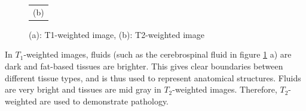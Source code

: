 \begin{figure}[h!]
\begin{minipage}{.4\textwidth}
\begin{tabular}{c}
(b)
\end{tabular}
\end{minipage}
\caption{(a): T1-weighted image, (b): T2-weighted image}
\label{tweight}
\end{figure}
In \(T_1\)-weighted images, fluids (such as the cerebrospinal fluid in figure \ref{tweight} a) are dark and fat-based tissues are brighter. This gives clear boundaries between different tissue types, and is thus used to represent anatomical structures. Fluids are very bright and tissues are mid gray in \(T_2\)-weighted images. Therefore, \(T_2\)-weighted are used to demonstrate pathology.